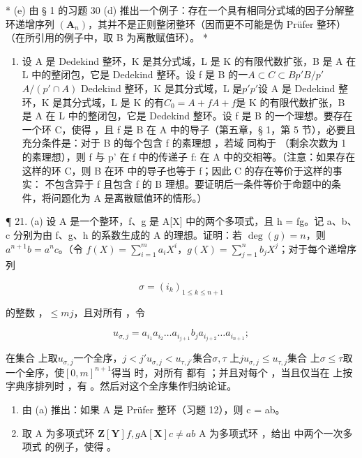 * (e) 由 § 1 的习题 30 (d) 推出一个例子：存在一个具有相同分式域的因子分解整环递增序列 \((\mathbf{A}_n)\)，其并不是正则整闭整环（因而更不可能是伪 Prüfer 整环）（在所引用的例子中，取 B 为离散赋值环）。 *

\begin{enumerate}
\def\labelenumi{\arabic{enumi}.}
\setcounter{enumi}{19}
\tightlist
\item
  设 A 是 Dedekind 整环，K 是其分式域，L 是 K 的有限代数扩张，B 是 A 在 L 中的整闭包，它是 Dedekind 整环。设 f 是 B 的一\(A \subset C \subset B\)\(p'\)\(B/p'\)\(A/(p' \cap A)\) Dedekind 整环，K 是其分式域，L 是\(p'\)\(p'\)设 A 是 Dedekind 整环，K 是其分式域，L 是 K 的有\(C_{0} = A + f\)\(A + f\)是 K 的有限代数扩张，B 是 A 在 L 中的整闭包，它是 Dedekind 整环。设 f 是 B 的一个理想。要存在一个环 C，使得 ，且 f 是 B 在 A 中的导子（第五章，§ 1，第 5 节），必要且充分条件是：对于 B 的每个包含 f 的素理想 ，若域  同构于 （剩余次数为 1 的素理想），则 f 与 p' 在 f 中的传递子 f:  在 A 中的交相等。（注意：如果存在这样的环 C，则 B 在环  中的导子也等于 f；因此 C 的存在等价于这样的事实： 不包含异于 f 且包含 f 的 B 理想。要证明后一条件等价于命题中的条件，将问题化为 A 是离散赋值环的情形。）
\end{enumerate}

¶ 21. (a) 设 A 是一个整环，f、g 是 A{[}X{]} 中的两个多项式，且 h = fg。记 a、b、c 分别为由 f、g、h 的系数生成的 A 的理想。证明：若 \(\deg(g) = n\)，则 \(a^{n+1}b = a^{n}c\)。（令 \(f(X) = \sum_{i=1}^{m} a_{i}X^{i}\)，\(g(X) = \sum_{j=1}^{n} b_{j}X^{j}\)；对于每个递增序列

\[
\sigma = (i _ {k}) _ {1 \leqslant k \leqslant n + 1}
\]

的整数 ，\(\leqslant m\)\(j\)，且对所有 ，令

\[
u _ {\sigma , j} = a _ {i _ {1}} a _ {i _ {2}} \dots a _ {i _ {j + 1}} b _ {j} a _ {i _ {j + 2}} \dots a _ {i _ {n + 1}};
\]

在集合  上取\(u_{\sigma,j}\)一个全序，\(j < j'\)\(u_{\sigma,j} < u_{\tau,j'}\)集合\(\sigma, \tau\)  上\(j\)\(u_{\sigma,j} \leqslant u_{\tau,j}\)集合  上\(\sigma \leqslant \tau\)取一个全序，使\([0, m]^{n+1}\)得当  时，对所有  都有 ；并且对每个 ，当且仅当在  上按字典序排列时 ，有 。然后对这个全序集作归纳论证。

\begin{enumerate}
\def\labelenumi{(\alph{enumi})}
\setcounter{enumi}{1}
\item
  由 (a) 推出：如果 A 是 Prüfer 整环（习题 12），则 c = ab。
\item
  取 A 为多项式环 \(\mathbf{Z}[\mathbf{Y}]\)\(f, g\)\(\mathrm{A}[\mathbf{X}]\)\(c \neq ab\) A 为多项式环 ，给出  中两个一次多项式  的例子，使得 。
\end{enumerate}

